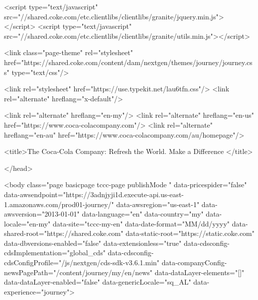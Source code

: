  
    
    
    

    

    
    
    
    
<script type="text/javascript" src="//shared.coke.com/etc.clientlibs/clientlibs/granite/jquery.min.js"></script>
<script type="text/javascript" src="//shared.coke.com/etc.clientlibs/clientlibs/granite/utils.min.js"></script>


         
    

    
    	
	<link class="page-theme" rel="stylesheet" href="https://shared.coke.com/content/dam/nextgen/themes/journey/journey.css" type="text/css"/>

	<link rel="stylesheet" href="https://use.typekit.net/lau6tfn.css"/>
	<link rel="alternate" hreflang="x-default"/>

	<link rel="alternate" hreflang="en-my"/>
<link rel="alternate" hreflang="en-us" href="https://www.coca-colacompany.com"/>
<link rel="alternate" hreflang="en-au" href="https://www.coca-colacompany.com/au/homepage"/>
	
	
    <title>The Coca-Cola Company: Refresh the World. Make a Difference </title>
    
    
    
    
    



</head>

<body class="page basicpage tccc-page publishMode " data-pricespider="false" data-awsendpoint="https://3adnjyji1d.execute-api.us-east-1.amazonaws.com/prod01-journey/" data-awsregion="us-east-1" data-awsversion="2013-01-01" data-language="en" data-country="my" data-locale="en-my" data-site="tccc-my-en" data-date-format="MM/dd/yyyy" data-shared-root="https://shared.coke.com" data-static-root="https://static.coke.com" data-dbversions-enabled="false" data-extensionless="true" data-cdsconfig-cdsImplementation="global_cds" data-cdsconfig-cdsConfigProfile="/js/nextgen/cds-sdk-v3.6.1.min" data-companyConfig-newsPagePath="/content/journey/my/en/news" data-dataLayer-elements="[]" data-dataLayer-enabled="false" data-genericLocale="sq_AL" data-experience="journey">

    
        
    
    
    
        



